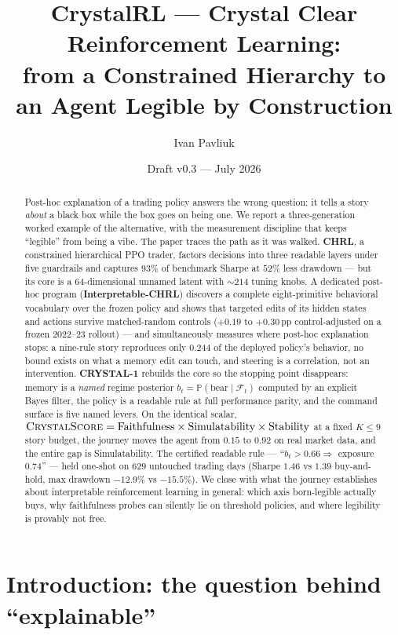 \documentclass[11pt]{article}
\title{CrystalRL --- Crystal Clear Reinforcement Learning:\\
\large from a Constrained Hierarchy to an Agent Legible by Construction}
\author{Ivan Pavliuk}
\date{Draft v0.3 --- July 2026}
\newcommand{\Prob}{\mathbb{P}}
\begin{document}
\maketitle

\begin{abstract}
Post-hoc explanation of a trading policy answers the wrong question: it tells a story
\emph{about} a black box while the box goes on being one. We report a three-generation worked
example of the alternative, with the measurement discipline that keeps ``legible'' from being a
vibe. The paper traces the path as it was walked. \textbf{CHRL}, a constrained hierarchical PPO
trader, factors decisions into three readable layers under five guardrails and captures $93\%$
of benchmark Sharpe at $52\%$ less drawdown --- but its core is a 64-dimensional unnamed latent
with ${\sim}214$ tuning knobs. A dedicated post-hoc program (\textbf{Interpretable-CHRL})
discovers a complete eight-primitive behavioral vocabulary over the frozen policy and shows that
targeted edits of its hidden states and actions survive matched-random controls ($+0.19$ to
$+0.30$\,pp control-adjusted on a frozen 2022--23 rollout) --- and simultaneously measures where post-hoc
explanation stops: a nine-rule story reproduces only $0.244$ of the deployed policy's behavior,
no bound exists on what a memory edit can touch, and steering is a correlation, not an
intervention. \textbf{CRYSTAL-1} rebuilds the core so the stopping point disappears: memory is a
\emph{named} regime posterior $b_t = \Prob(\text{bear}\mid\mathcal{F}_t)$ computed by an explicit
Bayes filter, the policy is a readable rule at full performance parity, and the command surface
is five named levers. On the identical scalar,
$\textsc{CrystalScore} = \text{Faithfulness}\times\text{Simulatability}\times\text{Stability}$
at a fixed $K{\le}9$ story budget, the journey moves the agent from $0.15$ to $0.92$ on real
market data, and the entire gap is Simulatability. The certified readable rule ---
``$b_t > 0.66 \Rightarrow$ exposure $0.74$'' --- held one-shot on 629 untouched trading days
(Sharpe $1.46$ vs $1.39$ buy-and-hold, max drawdown $-12.9\%$ vs $-15.5\%$). We close with what
the journey establishes about interpretable reinforcement learning in general: which axis
born-legible actually buys, why faithfulness probes can silently lie on threshold policies, and
where legibility is provably not free.
\end{abstract}

\section{Introduction: the question behind ``explainable''}
\label{sec:intro}
\end{document}
